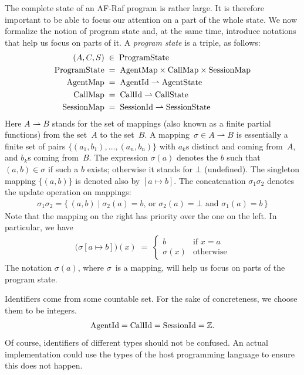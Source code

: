 \documentclass[a4paper,12pt,oneside,fleqn]{book} %
\newcommand{\pmap}{\rightharpoonup}
\begin{document}
{The complete state of an AF-Raf program is rather large. It is therefore
important to be able to focus our attention on a part of the whole state.
We now formalize the notion of program state and, at the same time,
introduce notations that help us focus on parts of it. A \emph{program
state} is a triple, as follows:
\begin{align}
(A, C, S) &\;\in\; {\rm ProgramState}
\\
{\rm ProgramState} &\;=\;
  {\rm AgentMap}\times{\rm CallMap}\times{\rm SessionMap}
\\
{\rm AgentMap} &\;=\; {\rm AgentId}\pmap{\rm AgentState}
\\
{\rm CallMap} &\;=\; {\rm CallId}\pmap{\rm CallState}
\\
{\rm SessionMap} &\;=\; {\rm SessionId}\pmap{\rm SessionState}
\end{align}
Here $A\pmap B$ stands for the set of mappings (also known as a finite
partial functions) from the set~$A$ to the set~$B$. A mapping~$\sigma\in
A\pmap B$ is essentially a finite set of pairs
$\{(a_1,b_1),\ldots,(a_n,b_n)\}$ with $a_k$s distinct and coming from~$A$,
and $b_k$s coming from~$B$. The expression $\sigma(a)$ denotes the $b$ such
that $(a,b)\in\sigma$ if such a $b$ exists; otherwise it stands for $\bot$
(undefined). The singleton mapping $\{(a,b)\}$ is denoted also by
$[a\mapsto b]$.  The concatenation $\sigma_1\sigma_2$ denotes the update
operation on mappings:
\begin{align}
\sigma_1\sigma_2 = \{\,(a,b)\mid
  \text{$\sigma_2(a)=b$, or $\sigma_2(a)=\bot$ and $\sigma_1(a)=b$}\,\}
\end{align}
Note that the mapping on the right has priority over the one on the left.
In particular, we have
\begin{align}
\bigl(\sigma[a\mapsto b]\bigr)(x) \;=\;
  \begin{cases}
  b & \text{if $x=a$} \\
  \sigma(x) & \text{otherwise}
  \end{cases}
\end{align}
The notation $\sigma(a)$, where $\sigma$~is a mapping, will help us focus
on parts of the program state.

Identifiers come from some countable set. For the sake of concreteness, we
choose them to be integers.
\begin{align}
{\rm AgentId} = {\rm CallId} = {\rm SessionId} = \mathbb{Z}.
\end{align}
Of course, identifiers of different types should not be confused. An actual
implementation could use the types of the host programming language to
ensure this does not happen.

}
\end{document}

